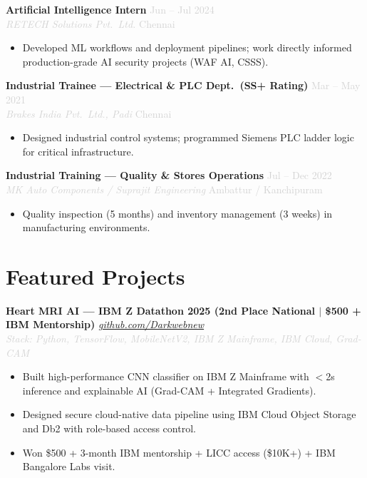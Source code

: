 \documentclass[9.5pt, letterpaper]{article}
\newcommand{\role}[4]{%
  \textbf{#1} \hfill \textcolor{lightgray}{\small #2}\\[-1pt]
  \textit{\textcolor{lightgray}{\small #3}} \hfill \textcolor{lightgray}{\small #4}}
\newcommand{\proj}[3]{%
  \textbf{#1} \hfill \textcolor{lightgray}{\small\textit{#2}}\\[-2pt]
  {\footnotesize\textit{\textcolor{lightgray}{Stack: #3}}}}
\begin{document}
\role{Artificial Intelligence Intern}{Jun -- Jul 2024}{RETECH Solutions Pvt.\ Ltd.}{Chennai}
\begin{itemize}
  \item Developed ML workflows and deployment pipelines; work directly informed production-grade AI security projects (WAF AI, CSSS).
\end{itemize}
\vspace{4pt}

\role{Industrial Trainee --- Electrical \& PLC Dept.\ \textbf{(SS+ Rating)}}{Mar -- May 2021}{Brakes India Pvt.\ Ltd., Padi}{Chennai}
\begin{itemize}
  \item Designed industrial control systems; programmed Siemens PLC ladder logic for critical infrastructure.
\end{itemize}
\vspace{4pt}

\role{Industrial Training --- Quality \& Stores Operations}{Jul -- Dec 2022}{MK Auto Components / Suprajit Engineering}{Ambattur / Kanchipuram}
\begin{itemize}
  \item Quality inspection (5 months) and inventory management (3 weeks) in manufacturing environments.
\end{itemize}

\section{Featured Projects}
\vspace{1pt}

\proj{Heart MRI AI --- IBM Z Datathon 2025 \textbf{(2nd Place National $|$ \$500 + IBM Mentorship)}}{\href{https://github.com/Darkwebnew/AI-Powered-Heart-MRI-Classification-for-Clinical-Decision-Support}{github.com/Darkwebnew}}{Python, TensorFlow, MobileNetV2, IBM Z Mainframe, IBM Cloud, Grad-CAM}
\begin{itemize}
  \item Built high-performance CNN classifier on IBM Z Mainframe with $<$2s inference and explainable AI (Grad-CAM + Integrated Gradients).
  \item Designed secure cloud-native data pipeline using IBM Cloud Object Storage and Db2 with role-based access control.
  \item Won \$500 + 3-month IBM mentorship + LICC access (\$10K+) + IBM Bangalore Labs visit.
\end{itemize}
\vspace{4pt}
\end{document}
